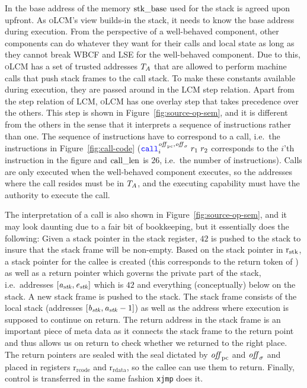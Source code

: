 \documentclass[acmsmall,review,anonymous]{acmart}\settopmatter{printfolios=true,printccs=false,printacmref=false}
\renewcommand{\rretc}{\mathrm{r}_{\mathrm{rcode}}}
\renewcommand{\rretd}{\mathrm{r}_{\mathrm{rdata}}}
\newcommand{\trgcm}{\textsc{LCM}}
\newcommand{\srccm}{\textsc{oLCM}}
\begin{document}
In \stktokens{} the base address of the memory $\mathrm{stk\_base}$ used for the stack is agreed upon upfront.
As \srccm{}'s view builds-in the stack, it needs to know the base address during execution.
From the perspective of a well-behaved component, other components can do whatever they want for their calls and local state as long as they cannot break WBCF and LSE for the well-behaved component.
Due to this, \srccm{} has a set of trusted addresses $T_{A}$ that are allowed to perform machine calls that push stack frames to the call stack.
To make these constants available during execution, they are passed around in the \trgcm{} step relation.
Apart from the step relation of \trgcm{}, \srccm{} has one overlay step that takes precedence over the others.
This step is shown in Figure~\ref{fig:source-op-sem}, and it is different from the others in the sense that it interprets a sequence of instructions rather than one.
The sequence of instructions have to correspond to a call, i.e.\ the instructions in Figure~\ref{fig:call-code} ({\footnotesize $\scall[i]{\offpc,\offsigma}{r_1}{r_2}$} corresponds to the $i$'th instruction in the figure and $\mathrm{call\_len}$ is $26$, i.e.\ the number of instructions).
Calls are only executed when the well-behaved component executes, so the addresses where the call resides must be in $T_{A}$, and the executing capability must have the authority to execute the call.

The interpretation of a call is also shown in Figure~\ref{fig:source-op-sem}, and it may look daunting due to a fair bit of bookkeeping, but it essentially does the following: Given a stack pointer in the stack register, $42$ is pushed to the stack to insure that the stack frame will be non-empty.
Based on the stack pointer in $\mathrm{r}_\mathrm{stk}$, a stack pointer for the callee is created (this corresponds to the return token of \stktokens{}) as well as a return pointer which governs the private part of the stack, i.e.\ addresses $[\mathit{a}_{\mathit{stk}},\mathit{e}_{\mathit{stk}}]$ which is $42$ and everything (conceptually) below on the stack.
A new stack frame is pushed to the stack.
The stack frame consists of the local stack (addresses $[\mathit{b}_{\mathit{stk}},\mathit{a}_{\mathit{stk}}-1]$) as well as the address where execution is supposed to continue on return.
The return address in the stack frame is an important piece of meta data as it connects the stack frame to the return point and thus allows us on return to check whether we returned to the right place.
The return pointers are sealed with the seal dictated by $\mathit{off}_{\mathrm{pc}}$ and $\mathit{off}_\sigma$ and placed in registers $\rretc$ and $\rretd$, so the callee can use them to return.
Finally, control is transferred in the same fashion \texttt{xjmp} does it.
\end{document}

